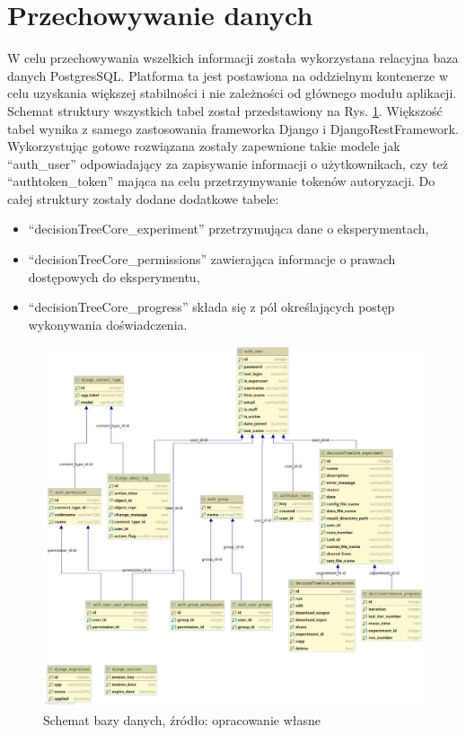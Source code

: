 \section{Przechowywanie danych}
W celu przechowywania wszelkich informacji została wykorzystana relacyjna baza danych PostgresSQL. Platforma ta jest postawiona na oddzielnym kontenerze w celu uzyskania większej stabilności i nie zależności od głównego modułu aplikacji. Schemat struktury wszystkich tabel został przedstawiony na Rys. \ref{rys5_database_schema}. Większość tabel wynika z samego zastosowania frameworka Django i DjangoRestFramework. Wykorzystując gotowe rozwiązana zostały zapewnione takie modele jak \enquote{auth\_user} odpowiadający za zapisywanie informacji o użytkownikach, czy też \enquote{authtoken\_token} mająca na celu przetrzymywanie tokenów autoryzacji. Do całej struktury zostały dodane dodatkowe tabele:
\begin{itemize}
	\item \enquote{decisionTreeCore\_experiment} przetrzymująca dane o eksperymentach,  
	\item \enquote{decisionTreeCore\_permissions} zawierająca informacje o prawach dostępowych do eksperymentu,
	\item \enquote{decisionTreeCore\_progress} składa się z pól określających postęp wykonywania doświadczenia.
\end{itemize}
\begin{figure}[htb]
	\centering
	\includegraphics[angle=270, width=16cm]{grafika/database_schema.eps}
	\caption{Schemat bazy danych, źródło: opracowanie własne}
	\label{rys5_database_schema}
\end{figure}
